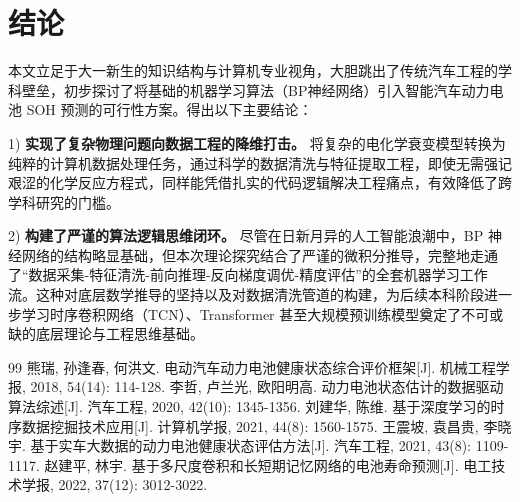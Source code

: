 \documentclass[10pt, a4paper, twocolumn]{ctexart}
\begin{document}
\section{结\quad 论}
本文立足于大一新生的知识结构与计算机专业视角，大胆跳出了传统汽车工程的学科壁垒，初步探讨了将基础的机器学习算法（BP神经网络）引入智能汽车动力电池 SOH 预测的可行性方案。得出以下主要结论：

1) \textbf{实现了复杂物理问题向数据工程的降维打击。} 将复杂的电化学衰变模型转换为纯粹的计算机数据处理任务，通过科学的数据清洗与特征提取工程，即使无需强记艰涩的化学反应方程式，同样能凭借扎实的代码逻辑解决工程痛点，有效降低了跨学科研究的门槛。

2) \textbf{构建了严谨的算法逻辑思维闭环。} 尽管在日新月异的人工智能浪潮中，BP 神经网络的结构略显基础，但本次理论探究结合了严谨的微积分推导，完整地走通了“数据采集-特征清洗-前向推理-反向梯度调优-精度评估”的全套机器学习工作流。这种对底层数学推导的坚持以及对数据清洗管道的构建，为后续本科阶段进一步学习时序卷积网络（TCN）、Transformer 甚至大规模预训练模型奠定了不可或缺的底层理论与工程思维基础。

\renewcommand{\refname}{\zihao{5}\heiti 参考文献} 
\vspace{-1em}
\begin{thebibliography}{99}
\songti 
{} 熊瑞, 孙逢春, 何洪文. 电动汽车动力电池健康状态综合评价框架[J]. 机械工程学报, 2018, 54(14): 114-128.
 李哲, 卢兰光, 欧阳明高. 动力电池状态估计的数据驱动算法综述[J]. 汽车工程, 2020, 42(10): 1345-1356.
 刘建华, 陈维. 基于深度学习的时序数据挖掘技术应用[J]. 计算机学报, 2021, 44(8): 1560-1575.
 王震坡, 袁昌贵, 李晓宇. 基于实车大数据的动力电池健康状态评估方法[J]. 汽车工程, 2021, 43(8): 1109-1117.
 赵建平, 林宇. 基于多尺度卷积和长短期记忆网络的电池寿命预测[J]. 电工技术学报, 2022, 37(12): 3012-3022.
\end{thebibliography}
\end{document}
